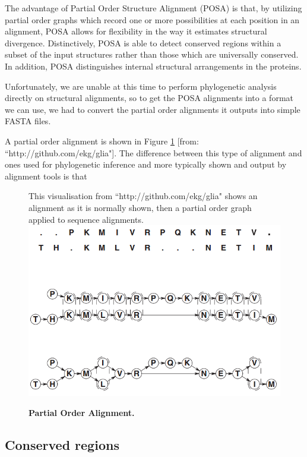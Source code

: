 \documentclass[10pt,letterpaper]{article}
\begin{document}
The advantage of Partial Order Structure Alignment (POSA) is that, by utilizing partial order graphs which record one or more possibilities at each position in an alignment, POSA allows for flexibility in the way it estimates structural divergence. \cite{POSA} 
Distinctively, POSA is able to detect conserved regions within a subset of the input structures rather than those which are universally conserved.  In addition, POSA distinguishes internal structural arrangements in the proteins. \cite{POSA} 


Unfortunately, we are unable at this time to perform phylogenetic analysis directly on structural alignments, so to get the POSA alignments into a format we can use, we had to convert the partial order alignments it outputs into simple FASTA files.

A partial order alignment is shown in Figure \ref{POA} [from: ``http://github.com/ekg/glia"].  The difference between this type of alignment and ones used for phylogenetic inference and more typically shown and output by alignment tools is that

\begin{figure}
  \caption{\bf Partial Order Alignment.} This visualisation from ``http://github.com/ekg/glia" shows an alignment as it is normally shown, then a partial order graph applied to sequence alignments.
  \centering
    \includegraphics[width=\textwidth]{POA.png}
  \label{POA}  
\end{figure}

\subsection*{Conserved regions}
\end{document}
